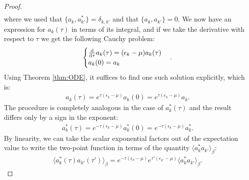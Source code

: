 \begin{proof}
\begin{align*}
	\end{align*}
	where we used that $\{a_k,a^*_{k'}\}=\delta_{k,k'}$ and that $\{a_k,a_{k'}\}=0$. We now
	have an expression for $a_k(\tau)$ in terms of its integral, and if we take the derivative
	with respect to $\tau$ we get the following Cauchy problem:
	\begin{align*}
		\begin{cases}
			\frac{\mathrm{d}}{\mathrm{d}\tau}a_k(\tau) = (\epsilon_k-\mu) a_k(\tau) \\
			a_k(0) = a_k
		\end{cases}.
	\end{align*}
	Using Theorem \ref{thm:ODE}, it suffices to find one such solution explicitly, which is:
	\begin{align*}
		a_k(\tau) = e^{\tau(\epsilon_k-\mu)}a_k(0) = e^{\tau(\epsilon_k-\mu)}a_k.
	\end{align*}
	The procedure is completely analogous in the case of $a^*_k(\tau)$ and the result differs
	only by a sign in the exponent:
	\begin{align*}
		a^*_k(\tau) = e^{-\tau(\epsilon_k-\mu)}a^*_k(0) = e^{-\tau(\epsilon_k-\mu)}a^*_k.
	\end{align*}
	By linearity, we can take the scalar exponential factors out of the expectation value to
	write the two-point function in terms of the quantity $\langle a^*_k a_{k'}\rangle_\beta$:
	\begin{align*}
		\langle a^*_k(\tau) a_{k'}(\tau') \rangle_\beta
		= e^{-\tau(\epsilon_k-\mu)}e^{\tau'(\epsilon_{k'}-\mu)} \langle a^*_k a_{k'} \rangle_\beta.
	\end{align*}


\end{proof}
